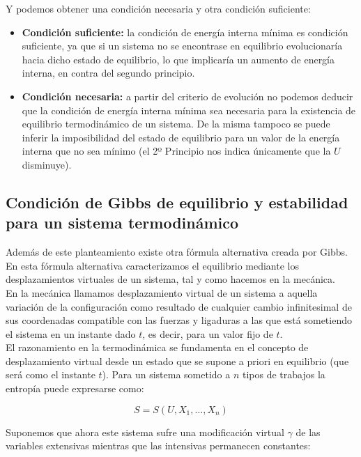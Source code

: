 \documentclass[12pt,a4paper]{article}
\begin{document}
Y podemos obtener una condición necesaria y otra condición suficiente:

\begin{itemize}
\item \textbf{Condición suficiente:} la condición de energía interna mínima es condición suficiente, ya que si un sistema no se encontrase en equilibrio evolucionaría hacia dicho estado de equilibrio, lo que implicaría un aumento de energía interna, en contra del segundo principio.

\item \textbf{Condición necesaria:} a partir del criterio de evolución no podemos deducir que la condición de energía interna mínima sea necesaria para la existencia de equilibrio termodinámico de un sistema. De la misma tampoco se puede inferir la imposibilidad del estado de equilibrio para un valor de la energía interna que no sea mínimo (el 2º Principio nos indica únicamente que la $U$ disminuye).

\end{itemize}

\subsection{Condición de Gibbs de equilibrio y estabilidad para un sistema termodinámico}

Además de este planteamiento existe otra fórmula alternativa creada por Gibbs. En esta fórmula alternativa caracterizamos el equilibrio  mediante los desplazamientos virtuales de un sistema, tal y como hacemos en la mecánica. \\

En la mecánica llamamos desplazamiento virtual de un sistema a aquella variación de la configuración como resultado de cualquier cambio infinitesimal de sus coordenadas compatible con las fuerzas y ligaduras a las que está sometiendo el sistema en un instante dado $t$, es decir, para un valor fijo de $t$. \\

El razonamiento en la termodinámica se fundamenta en el concepto de desplazamiento virtual desde un estado que se supone a priori en equilibrio (que será como el instante $t$). Para un sistema sometido a $n$ tipos de trabajos la entropía puede expresarse como:

\begin{equation}
S = S(U, X_1, \ldots, X_n)
\end{equation}

Suponemos que ahora este sistema sufre una modificación virtual $\gamma$ de las variables extensivas mientras que las intensivas permanecen constantes:
\end{document}
